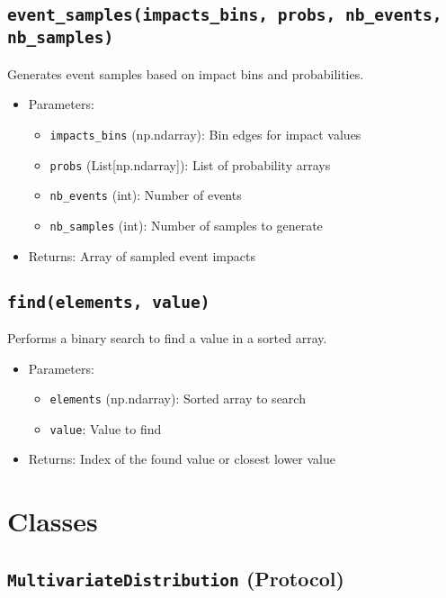 \documentclass{article}
\begin{document}
\subsection{\texttt{event\_samples(impacts\_bins, probs, nb\_events, nb\_samples)}}

Generates event samples based on impact bins and probabilities.

\begin{itemize}
    \item Parameters:
    \begin{itemize}
        \item \texttt{impacts\_bins} (np.ndarray): Bin edges for impact values
        \item \texttt{probs} (List[np.ndarray]): List of probability arrays
        \item \texttt{nb\_events} (int): Number of events
        \item \texttt{nb\_samples} (int): Number of samples to generate
    \end{itemize}
    \item Returns: Array of sampled event impacts
\end{itemize}

\subsection{\texttt{find(elements, value)}}

Performs a binary search to find a value in a sorted array.

\begin{itemize}
    \item Parameters:
    \begin{itemize}
        \item \texttt{elements} (np.ndarray): Sorted array to search
        \item \texttt{value}: Value to find
    \end{itemize}
    \item Returns: Index of the found value or closest lower value
\end{itemize}

\section{Classes}

\subsection{\texttt{MultivariateDistribution} (Protocol)}
\end{document}
